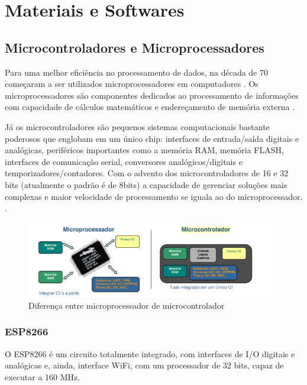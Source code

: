 \chapter{Materiais e Softwares}

\section{Microcontroladores e Microprocessadores}

Para uma melhor eficiência no processamento de dados, na década de 70
começaram a ser utilizados microprocessadores em computadores \cite{martins2005sistemas}. Os microprocessadores são componentes dedicados ao processamento de informações com
capacidade de cálculos matemáticos e endereçamento de memória externa \cite{chase2007sistemas}.

Já os microcontroladores são pequenos sistemas computacionais bastante poderosos que englobam em um único chip: interfaces de entrada/saída digitais e analógicas, periféricos importantes como a memória RAM, memória FLASH, interfaces de comunicação serial, conversores analógicos/digitais e temporizadores/contadores. Com o advento dos microcontroladores de 16 e 32 bits (atualmente o padrão é de 8bits) a capacidade de gerenciar soluções mais complexas e maior velocidade de processamento se iguala ao do microprocessador. \cite{chase2007sistemas}.

\begin{figure}[htbp]
	\centering
	\includegraphics[scale=0.7]{figuras/processa-controla.png}
	\caption{Diferença entre microprocessador de microcontrolador}
	\label{microprocessador-microcontrolador}
\end{figure}

\subsection{ESP8266}

O ESP8266 é um circuito totalmente integrado, com interfaces de I/O digitais e analógicas e, ainda, interface WiFi, com um processador de 32 bits, capaz de executar a 160 MHz.

